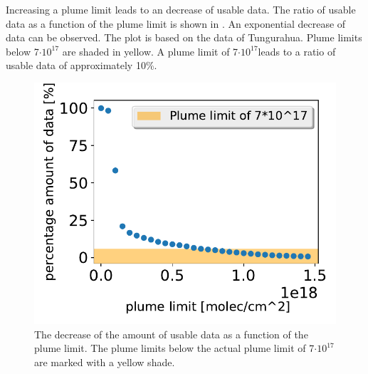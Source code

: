 Increasing a plume limit leads to an decrease of usable data. The ratio of usable  data as a function of the plume limit is shown in . An exponential decrease of data can be observed. The plot is based on the data of Tungurahua. Plume limits below 7$\cdot10^{17}$ are shaded in yellow. A plume limit of 7$\cdot10^{17}$leads to a ratio of usable data of approximately 10\%.
\begin{figure}
	\centering
	\includegraphics[width=0.7\linewidth]{Bilder/percentage_minSO2}
	\caption{The decrease of the amount of usable data as a function of the plume limit. The plume limits below the actual plume limit of 7$\cdot10^{17}$ are marked with a yellow shade.}
	\label{fig:percentageminso2}
\end{figure}

